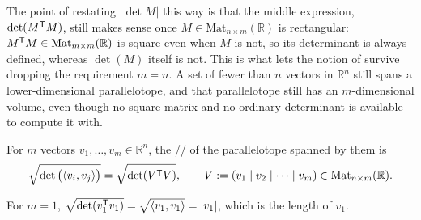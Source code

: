 \begin{ainote}
The point of restating $|\det M|$ this way is that the middle expression, $\det(M^{\mathsf{T}}
M)$, still makes sense once $M \in \mathrm{Mat}_{n\times m}(\mathbb{R})$ is rectangular:
$M^{\mathsf{T}} M \in \mathrm{Mat}_{m\times m}(\mathbb{R})$ is square even when $M$ is not, so its
determinant is always defined, whereas $\det(M)$ itself is not. This is what lets the
notion of  survive dropping the requirement $m=n$. A set of
fewer than $n$ vectors in $\mathbb{R}^n$ still spans a lower-dimensional parallelotope, and
that parallelotope still has an $m$-dimensional volume, even though no square matrix and no
ordinary determinant is available to compute it with.
\end{ainote}

\begin{definition}
\label{def:volume_gram_determinant}
For $m$ vectors $v_1,\dots,v_m \in \mathbb{R}^n$, the //
 of the parallelotope spanned by them is
\[\sqrt{\det\big(\langle v_i,v_j\rangle\big)} = \sqrt{\det(V^{\mathsf{T}} V)},
  \qquad V := (v_1\mid v_2\mid\cdots\mid v_m) \in \mathrm{Mat}_{n\times m}(\mathbb{R}).\]
\end{definition}

\begin{example}[$m=1$: the length of a vector]
\label{ex:gram_m1_length}
For $m=1$, $\sqrt{\det(v_1^{\mathsf{T}} v_1)} = \sqrt{\langle v_1,v_1\rangle} = |v_1|$,
which is the length of $v_1$.
\end{example}

